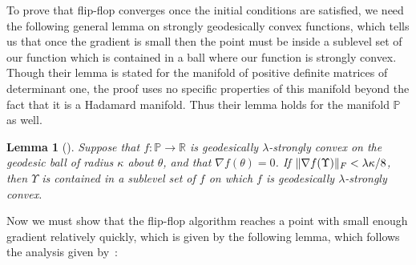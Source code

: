 \documentclass[aos]{imsart}
\newtheorem{lemma}[theorem]{Lemma}
\theoremstyle{definition}
\numberwithin{equation}{section}
\DeclarePairedDelimiter{\norm}{\lVert}{\rVert}
\newcommand{\R}{{\mathbb{R}}}
\newcommand{\SPD}{\mathbb{P}}
\begin{document}
To prove that flip-flop converges once the initial conditions are satisfied, we need the following general lemma \cite[Lemma 4.7]{FM20} on strongly geodesically convex functions, which tells us that once the gradient is small then the point must be inside a sublevel set of our function which is contained in a ball where our function is strongly convex. Though their lemma is stated for the manifold of positive definite matrices of determinant one, the proof uses no specific properties of this manifold beyond the fact that it is a Hadamard manifold. Thus their lemma holds for the manifold $\SPD$ as well.

\begin{lemma}[\cite{FM20}]\label{lem:gradient-strong-convexity-fm}
Suppose that $f : \SPD \to \R$ is geodesically $\lambda$-strongly convex on the geodesic ball of radius $\kappa$ about $\theta$, and that $\nabla f(\theta) = 0$.
If $\norm{\nabla f(\Upsilon)}_F < \lambda \kappa/8$, then $\Upsilon$ is contained in a sublevel set of $f$ on which $f$ is geodesically $\lambda$-strongly convex.
\end{lemma}
Now we must show that the flip-flop algorithm reaches a point with small enough gradient relatively quickly, which is given by the following lemma, which follows the analysis given by~\cite{GGOW19}:
\end{document}
